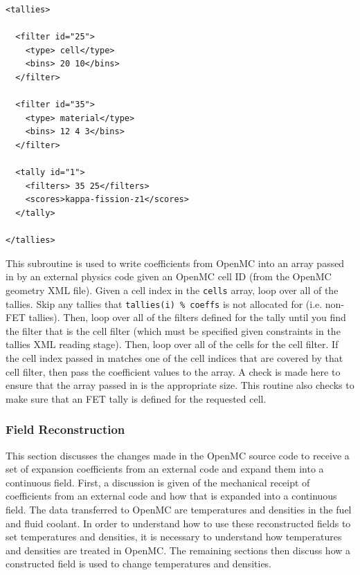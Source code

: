 \documentclass[10pt]{article}
\newcounter{subsubsubsection}[subsubsection]
\numberwithin{equation}{section} %
\begin{document}
\begin{lstlisting}
<tallies>

  <filter id="25">
    <type> cell</type>
    <bins> 20 10</bins>
  </filter>

  <filter id="35">
    <type> material</type>
    <bins> 12 4 3</bins>
  </filter>

  <tally id="1">
    <filters> 35 25</filters>
    <scores>kappa-fission-z1</scores>
  </tally>

</tallies>
\end{lstlisting}

This subroutine is used to write coefficients from OpenMC into an array passed in by an external physics code given an OpenMC cell ID (from the OpenMC geometry XML file). Given a cell index in the {\tt cells} array, loop over all of the tallies. Skip any tallies that {\tt tallies(i) \% coeffs} is not allocated for (i.e. non-FET tallies). Then, loop over all of the filters defined for the tally until you find the filter that is the cell filter (which must be specified given constraints in the tallies XML reading stage). Then, loop over all of the cells for the cell filter. If the cell index passed in matches one of the cell indices that are covered by that cell filter, then pass the coefficient values to the array. A check is made here to ensure that the array passed in is the appropriate size. This routine also checks to make sure that an FET tally is defined for the requested cell.


\subsubsection{Field Reconstruction}
This section discusses the changes made in the OpenMC source code to receive a set of expansion coefficients from an external code and expand them into a continuous field. First, a discussion is given of the mechanical receipt of coefficients from an external code and how that is expanded into a continuous field. The data transferred to OpenMC are temperatures and densities in the fuel and fluid coolant. In order to understand how to use these reconstructed fields to set temperatures and densities, it is necessary to understand how temperatures and densities are treated in OpenMC. The remaining sections then discuss how a constructed field is used to change temperatures and densities.
\end{document}
